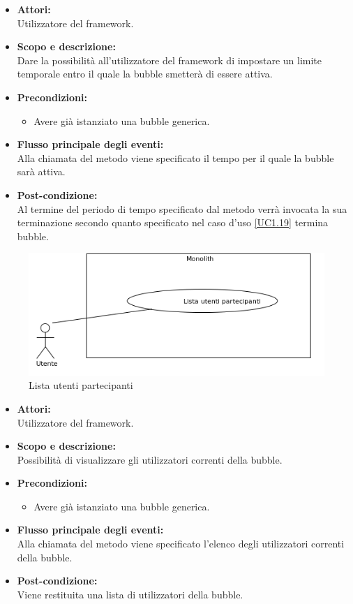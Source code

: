 \begin{itemize}
	\item \textbf{Attori:}
	\\Utilizzatore del framework.
	\item \textbf{Scopo e descrizione:} 
	\\Dare la possibilità all'utilizzatore del framework di impostare un limite temporale entro il quale la bubble smetterà di essere attiva.
	\item \textbf{Precondizioni:}
	\begin{itemize}
		\item Avere già istanziato una bubble generica.
	\end{itemize}
	\item \textbf{Flusso principale degli eventi:}
	\\Alla chiamata del metodo viene specificato il tempo per il quale la bubble sarà attiva.
	\item \textbf{Post-condizione:}
	\\Al termine del periodo di tempo specificato dal metodo verrà invocata la sua terminazione secondo quanto specificato nel caso d'uso \ref{UC1.19} termina bubble.
\end{itemize}


\begin{figure}[H]
	\centering
	\includegraphics[width=15cm]{../../documenti/AnalisiDeiRequisiti/Diagrammi_img/uc1_14.png}
	\caption{\UCCaption{} Lista utenti partecipanti}
\end{figure}

\begin{itemize}
	\item \textbf{Attori:}
	\\Utilizzatore del framework.
	\item \textbf{Scopo e descrizione:} 
	\\Possibilità di visualizzare gli utilizzatori correnti della bubble.
	\item \textbf{Precondizioni:}
	\begin{itemize}
		\item Avere già istanziato una bubble generica.
	\end{itemize}
	\item \textbf{Flusso principale degli eventi:}
	\\Alla chiamata del metodo viene specificato l'elenco degli utilizzatori correnti della bubble.
	\item \textbf{Post-condizione:}
	\\Viene restituita una lista di utilizzatori della bubble.
\end{itemize}

